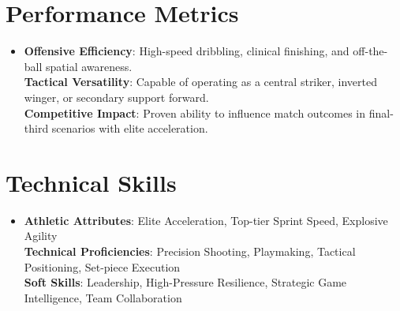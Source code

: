 \documentclass[letterpaper,11pt]{article}
\begin{document}
\section{Performance Metrics}
\begin{itemize}[leftmargin=0.15in, label={}]
\item{
\textbf{Offensive Efficiency}{: High-speed dribbling, clinical finishing, and off-the-ball spatial awareness.} \\
\textbf{Tactical Versatility}{: Capable of operating as a central striker, inverted winger, or secondary support forward.} \\
\textbf{Competitive Impact}{: Proven ability to influence match outcomes in final-third scenarios with elite acceleration.}
}
\end{itemize}

\section{Technical Skills}
\begin{itemize}[leftmargin=0.15in, label={}]
\item{
\textbf{Athletic Attributes}{: Elite Acceleration, Top-tier Sprint Speed, Explosive Agility} \\
\textbf{Technical Proficiencies}{: Precision Shooting, Playmaking, Tactical Positioning, Set-piece Execution} \\
\textbf{Soft Skills}{: Leadership, High-Pressure Resilience, Strategic Game Intelligence, Team Collaboration}
}
\end{itemize}
\end{document}
